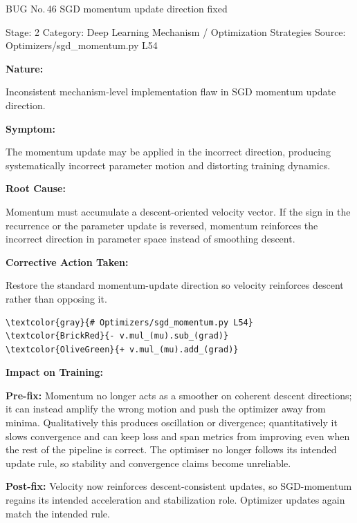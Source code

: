 \documentclass[10pt]{article}
\newcommand{\FieldLabel}[1]{%
 {\bfseries #1:}\par
}
\begin{document}
\begin{bugbox}{BUG No.\,46 \quad SGD momentum update direction fixed}
{\color{MetaGray}\small Stage: 2 \;\textbar\; Category: Deep Learning Mechanism / Optimization Strategies \;\textbar\; Source: Optimizers/sgd\_momentum.py L54\par}
\vspace{0.22em}
\FieldLabel{Nature}
Inconsistent mechanism-level implementation flaw in SGD momentum update direction.
\par
\vspace{0.35em}
\FieldLabel{Symptom}
The momentum update may be applied in the incorrect direction, producing systematically incorrect parameter motion and distorting training dynamics.
\par
\vspace{0.35em}
\FieldLabel{Root Cause}
Momentum must accumulate a descent-oriented velocity vector. If the sign in the recurrence or the parameter update is reversed, momentum reinforces the incorrect direction in parameter space instead of smoothing descent.
\par
\vspace{0.35em}
\FieldLabel{Corrective Action Taken}
Restore the standard momentum-update direction so velocity reinforces descent rather than opposing it.
\par
\vspace{0.35em}
\begin{Verbatim}[commandchars=\\\{\},fontsize=\footnotesize,breaklines=true,breaksymbol={},frame=leftline,framerule=2pt,rulecolor=\color{gray!40},xleftmargin=6pt,formatcom=\singlespacing]
\textcolor{gray}{# Optimizers/sgd_momentum.py L54}
\textcolor{BrickRed}{- v.mul_(mu).sub_(grad)}
\textcolor{OliveGreen}{+ v.mul_(mu).add_(grad)}
\end{Verbatim}
\vspace{0.22em}
\FieldLabel{Impact on Training}
\textbf{Pre-fix:} Momentum no longer acts as a smoother on coherent descent directions; it can instead amplify the wrong motion and push the optimizer away from minima. Qualitatively this produces oscillation or divergence; quantitatively it slows convergence and can keep loss and span metrics from improving even when the rest of the pipeline is correct. The optimiser no longer follows its intended update rule, so stability and convergence claims become unreliable. \par\smallskip
\textbf{Post-fix:} Velocity now reinforces descent-consistent updates, so SGD-momentum regains its intended acceleration and stabilization role. Optimizer updates again match the intended rule. 
\par
\vspace{0.35em}
\end{bugbox}
\end{document}

